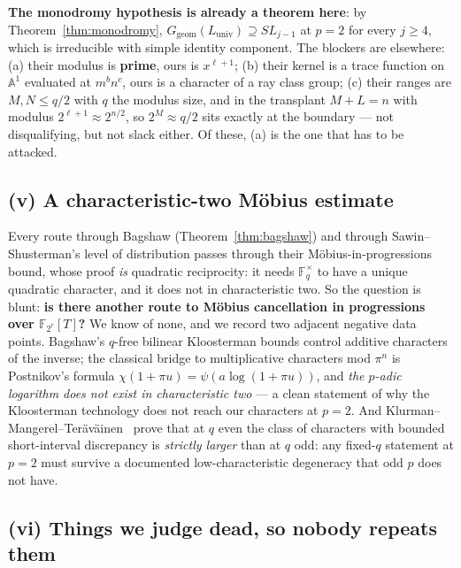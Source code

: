 \documentclass[10pt]{article}
\theoremstyle{plain}
\theoremstyle{definition}
\newcommand{\F}{\mathbb F}
\newcommand{\Luniv}{L_{\mathrm{univ}}}
\newcommand{\Ggeom}{G_{\mathrm{geom}}}
\begin{document}
\textbf{The monodromy hypothesis is already a theorem here}: by
Theorem~\ref{thm:monodromy}, $\Ggeom(\Luniv)\supseteq SL_{j-1}$ at $p=2$ for
every $j\ge4$, which is irreducible with simple identity component. The
blockers are elsewhere: (a) their modulus is \textbf{prime}, ours is
$x^{\ell+1}$; (b) their kernel is a trace function on $\mathbb A^1$ evaluated at
$m^bn^c$, ours is a character of a ray class group; (c) their ranges are
$M,N\le q/2$ with $q$ the modulus size, and in the transplant $M+L=n$ with
modulus $2^{\ell+1}\approx2^{n/2}$, so $2^M\approx q/2$ sits exactly at the
boundary --- not disqualifying, but not slack either. Of these, (a) is the one
that has to be attacked.

\subsection*{(v) A characteristic-two M\"obius estimate}

Every route through Bagshaw (Theorem~\ref{thm:bagshaw}) and through
Sawin--Shusterman's level of distribution passes through their
M\"obius-in-progressions bound, whose proof \emph{is} quadratic reciprocity:
it needs $\F_q^{\times}$ to have a unique quadratic character, and it does not
in characteristic two. So the question is blunt: \textbf{is there another route
to M\"obius cancellation in progressions over $\F_{2^r}[T]$?} We know of none,
and we record two adjacent negative data points. Bagshaw's $q$-free bilinear
Kloosterman bounds control additive characters of the inverse; the classical
bridge to multiplicative characters mod $\pi^n$ is Postnikov's formula
$\chi(1+\pi u)=\psi(a\log(1+\pi u))$, and \emph{the $p$-adic logarithm does not
exist in characteristic two} --- a clean statement of why the Kloosterman
technology does not reach our characters at $p=2$. And
Klurman--Mangerel--Ter\"av\"ainen~\cite{KMT} prove that at $q$ even the class of
characters with bounded short-interval discrepancy is \emph{strictly larger}
than at $q$ odd: any fixed-$q$ statement at $p=2$ must survive a documented
low-characteristic degeneracy that odd $p$ does not have.

\subsection*{(vi) Things we judge dead, so nobody repeats them}
\end{document}

